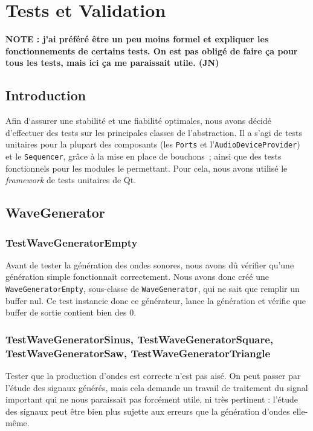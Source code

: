\section{Tests et Validation}

\textbf{NOTE : j'ai préféré être un peu moins formel et expliquer les fonctionnements de certains tests. On est pas obligé de faire ça pour tous les tests, mais ici ça me paraissait utile. (JN)}

\subsection{Introduction}

Afin
d`assurer une stabilité et une fiabilité optimales, nous avons décidé d'effectuer des tests sur les principales classes de l'abstraction. Il a s'agi de tests unitaires pour la plupart des composants (les \verb!Ports! et l'\verb!AudioDeviceProvider!)
et le \verb!Sequencer!, grâce à la mise en place de bouchons~;
ainsi que des tests fonctionnels pour les modules le permettant.
Pour cela, nous avons utilisé le \emph{framework} de tests
unitaires de Qt.

\subsection{WaveGenerator}

\subsubsection{TestWaveGeneratorEmpty}

Avant de tester la génération des ondes sonores, nous avons dû
vérifier qu'une génération simple fonctionnait correctement. Nous
avons donc créé une \verb!WaveGeneratorEmpty!, sous-classe de
\verb!WaveGenerator!, qui ne sait que remplir un buffer nul. Ce
test instancie donc ce générateur, lance la génération et vérifie
que buffer de sortie contient bien des 0.

\subsubsection{TestWaveGeneratorSinus, TestWaveGeneratorSquare, TestWaveGeneratorSaw, TestWaveGeneratorTriangle}

Tester que la production d'ondes est correcte n'est pas aisé. On
peut passer par l'étude des signaux générés, mais cela demande un
travail de traitement du signal important qui ne nous paraissait
pas forcément utile, ni très pertinent : l'étude des signaux peut
être bien plus sujette aux erreurs que la génération d'ondes
elle-même.

